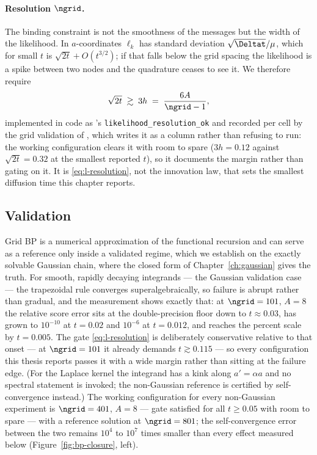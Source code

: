 \paragraph{Resolution $\ngrid$.} The binding constraint is not the smoothness
of the messages but the width of the likelihood. In $a$-coordinates
$\ell_k$ has standard deviation $\sqrt{\Deltat}/\mu$, which for small $t$ is
$\sqrt{2t} + O(t^{3/2})$; if that falls below the grid spacing the likelihood
is a spike between two nodes and the quadrature ceases to see it. We therefore
require
\begin{equation}
  \sqrt{2t} \;\gtrsim\; 3h \;=\; \frac{6A}{\ngrid - 1},
  \label{eq:l-resolution}
\end{equation}
implemented in code as 's
\texttt{likelihood\_resolution\_ok} and recorded per cell by the grid
validation of , which writes it as a column rather than
refusing to run: the working configuration clears it with room to spare
($3h = 0.12$ against $\sqrt{2t} = 0.32$ at the smallest reported $t$), so it
documents the margin rather than gating on it. It is
\eqref{eq:l-resolution}, not
the innovation law, that sets the smallest diffusion time this chapter reports.

\subsection{Validation}

Grid BP is a numerical approximation of the functional recursion and can serve
as a reference only inside a validated regime, which we establish on the
exactly solvable Gaussian chain, where the closed form of
Chapter~\ref{ch:gaussian} gives the truth. For smooth, rapidly decaying
integrands --- the Gaussian validation case --- the trapezoidal rule converges
superalgebraically, so failure is abrupt rather than gradual, and the
measurement shows exactly that: at $\ngrid = 101$, $A = 8$ the relative score
error sits at the double-precision floor down to $t \approx 0.03$, has grown
to $10^{-10}$ at $t = 0.02$ and $10^{-6}$ at $t = 0.012$, and reaches the
percent scale by $t = 0.005$. The gate \eqref{eq:l-resolution} is deliberately
conservative relative to that onset --- at $\ngrid = 101$ it already demands
$t \gtrsim 0.115$ --- so every configuration this thesis reports passes it
with a wide margin rather than sitting at the failure edge. (For the Laplace
kernel the integrand has a kink along $a' = \alpha a$ and no spectral
statement is invoked; the non-Gaussian reference is certified by
self-convergence instead.) The working configuration for every
non-Gaussian experiment is $\ngrid = 401$, $A = 8$ --- gate satisfied for all
$t \geq 0.05$ with room to spare --- with a reference solution
at $\ngrid = 801$; the self-convergence error between the two remains $10^4$ to
$10^7$ times smaller than every effect measured below
(Figure~\ref{fig:bp-closure}, left).

